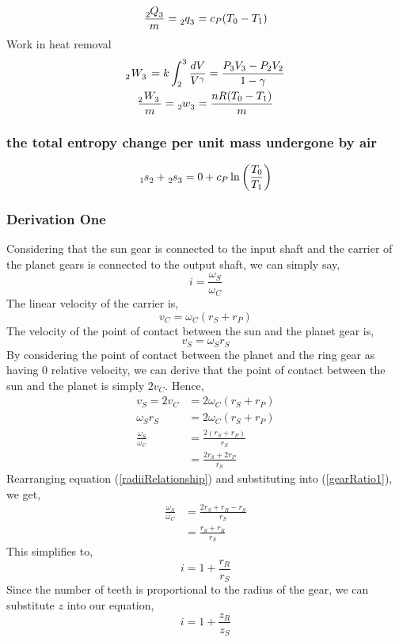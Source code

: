 \documentclass[12pt]{article}
\numberwithin{equation}{section}
\begin{document}
\begin{flushleft}
\begin{equation}
  \frac{\tensor[_2]{Q}{_3}}{m} = \tensor[_2]{q}{_3} = c_P (T_0 - T_1)
\end{equation}
Work in heat removal
\begin{gather}
  \tensor[_2]{W}{_3} = k \int_2^3 \frac{dV}{V^\gamma} = \frac{P_3 V_3 - P_2 V_2}{1 - \gamma} \\
  \frac{\tensor[_2]{W}{_3}}{m} = \tensor[_2]{w}{_3} = \frac{nR(T_0 - T_1)}{m}
\end{gather}
\subsubsection{the total entropy change per unit mass undergone by air}
\begin{equation}
  \tensor[_1]{s}{_2} + \tensor[_2]{s}{_3} = 0 + c_P \ln \left( \frac{T_0}{T_1} \right)
\end{equation}

\subsubsection{Derivation One}
Considering that the sun gear is connected to the input shaft and the carrier of the planet gears is connected to the output shaft, we can simply say,
\begin{equation}
  i = \frac{\omega_S}{\omega_C}
\end{equation}
The linear velocity of the carrier is,
\begin{equation}
  v_C = \omega_C (r_S + r_P)
\end{equation}
The velocity of the point of contact between the sun and the planet gear is,
\begin{equation}
  v_S = \omega_S r_S
\end{equation}
By considering the point of contact between the planet and the ring gear as having 0 relative velocity, we can derive that the point of contact between the sun and the planet is simply $2v_C$. Hence,
\begin{align}
  v_S = 2v_C &= 2\omega_C(r_S + r_P)\\
  \omega_S r_S &= 2\omega_C (r_S + r_P)\\
  \frac{\omega_S}{\omega_C} &= \frac{2(r_S + r_P)}{r_S}\\
  &= \frac{2r_S + 2r_P}{r_S} \label{gearRatio1}
\end{align}
Rearranging equation (\ref{radiiRelationship}) and substituting into (\ref{gearRatio1}), we get,
\begin{align}
  \frac{\omega_S}{\omega_C} &= \frac{2r_S + r_R - r_S}{r_S}\\
  &= \frac{r_S + r_R}{r_S}
\end{align}
This simplifies to,
\begin{equation}
  i = 1 + \frac{r_R}{r_S}
\end{equation}
Since the number of teeth is proportional to the radius of the gear, we can substitute $z$ into our equation,
\begin{equation}
  i = 1 + \frac{z_R}{z_S}
\end{equation}



\end{flushleft}
\end{document}
